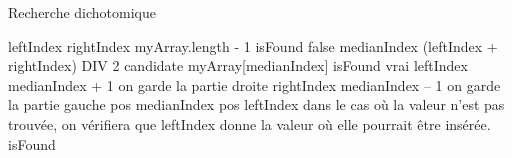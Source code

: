 \begin{Fiche}{Recherche dichotomique}
		\begin{pseudocode}
				\Empty
				\Let leftIndex 
				\Let rightIndex \Gets myArray.length - 1
				\Let isFound \Gets false
				\Empty
					\Let medianIndex \Gets (leftIndex + rightIndex) DIV 2
					\Let candidate \Gets myArray[medianIndex]
						\Let isFound \Gets vrai
						\Let leftIndex \Gets medianIndex + 1
						\RComment on garde la partie droite
					\Else
						\Let rightIndex \Gets medianIndex – 1
						\RComment on garde la partie gauche
					\EndIf
				\EndWhile
				\Empty
					\Let pos \Gets medianIndex
				\Else
					\Let pos \Gets leftIndex
					\RComment dans le cas où la valeur n’est pas trouvée,
					\Empty 
					\RComment on vérifiera que leftIndex donne la valeur 
					où elle pourrait être insérée.
				\EndIf
				\Empty
				\Return isFound
			\EndAlgo
		\end{pseudocode}
\end{Fiche}
